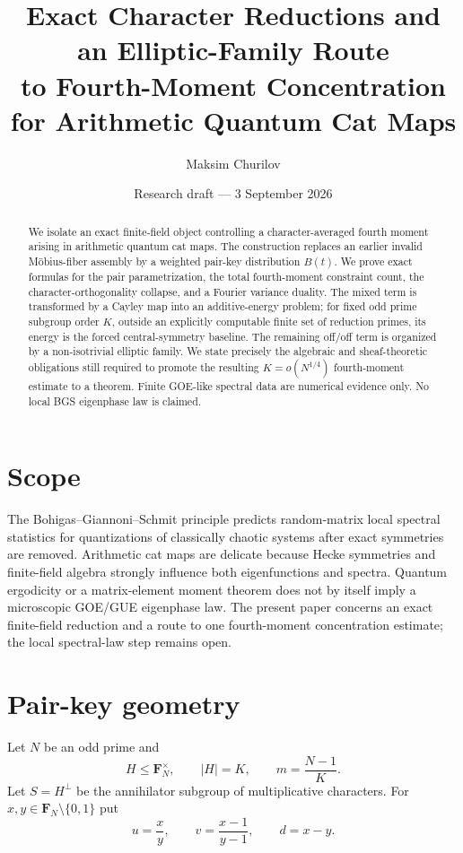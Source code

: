 \documentclass[11pt]{article}
\title{Exact Character Reductions and an Elliptic-Family Route\\to Fourth-Moment Concentration for Arithmetic Quantum Cat Maps}
\author{Maksim Churilov}
\date{Research draft --- 3 September 2026}
\newcommand{\F}{\mathbf F}
\newcommand{\1}{\mathbf 1}
\begin{document}
\maketitle

\begin{abstract}
We isolate an exact finite-field object controlling a character-averaged fourth moment arising in arithmetic quantum cat maps. The construction replaces an earlier invalid M\"obius-fiber assembly by a weighted pair-key distribution $B(t)$. We prove exact formulas for the pair parametrization, the total fourth-moment constraint count, the character-orthogonality collapse, and a Fourier variance duality. The mixed term is transformed by a Cayley map into an additive-energy problem; for fixed odd prime subgroup order $K$, outside an explicitly computable finite set of reduction primes, its energy is the forced central-symmetry baseline. The remaining off/off term is organized by a non-isotrivial elliptic family. We state precisely the algebraic and sheaf-theoretic obligations still required to promote the resulting $K=o(N^{1/4})$ fourth-moment estimate to a theorem. Finite GOE-like spectral data are numerical evidence only. No local BGS eigenphase law is claimed.
\end{abstract}

\section{Scope}
The Bohigas--Giannoni--Schmit principle predicts random-matrix local spectral statistics for quantizations of classically chaotic systems after exact symmetries are removed. Arithmetic cat maps are delicate because Hecke symmetries and finite-field algebra strongly influence both eigenfunctions and spectra. Quantum ergodicity or a matrix-element moment theorem does not by itself imply a microscopic GOE/GUE eigenphase law. The present paper concerns an exact finite-field reduction and a route to one fourth-moment concentration estimate; the local spectral-law step remains open.

\section{Pair-key geometry}
Let $N$ be an odd prime and
\[
H\leq\F_N^\times,\qquad |H|=K,\qquad m=\frac{N-1}{K}.
\]
Let $S=H^\perp$ be the annihilator subgroup of multiplicative characters. For $x,y\in\F_N\setminus\{0,1\}$ put
\[
u=\frac{x}{y},\qquad v=\frac{x-1}{y-1},\qquad d=x-y.
\]
\end{document}
